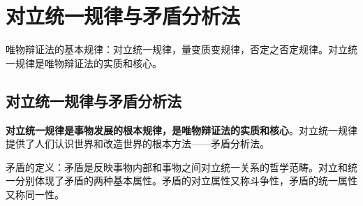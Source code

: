\documentclass[12pt,openany]{ctexbook}
\begin{document}
\section{对立统一规律与矛盾分析法}
唯物辩证法的基本规律：对立统一规律，量变质变规律，否定之否定规律。对立统一规律是唯物辩证法的实质和核心。
\subsection{对立统一规律与矛盾分析法}
\textbf{对立统一规律是事物发展的根本规律，是唯物辩证法的实质和核心}。对立统一规律提供了人们认识世界和改造世界的根本方法——矛盾分析法。
\begin{mdquote}
矛盾的定义：矛盾是反映事物内部和事物之间对立统一关系的哲学范畴。对立和统一分别体现了矛盾的两种基本属性。矛盾的对立属性又称斗争性，矛盾的统一属性又称同一性。
\end{mdquote}
\end{document}
